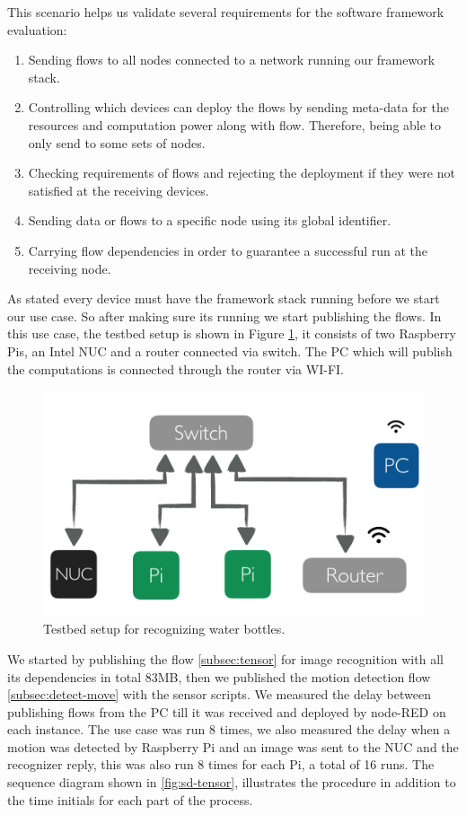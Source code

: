 This scenario helps us validate several requirements for the software framework evaluation: 
\begin{enumerate}
	\item Sending flows to all nodes connected to a network  running our framework stack.
	\item Controlling which devices can deploy the flows by sending meta-data for the resources and computation power along with flow. Therefore, being able to only send to some sets of nodes.
	\item Checking requirements of flows and rejecting the deployment if they were not satisfied at the receiving devices.
	\item Sending data or flows to a  specific node using its global identifier.
	\item Carrying flow dependencies in order to guarantee a successful run at the receiving node.
\end{enumerate}

\noindent As stated every device must have the framework stack running before we start our use case. So after making sure its running we start publishing the flows. In this use case, the testbed setup is shown in Figure \ref{fig:tb-tensor}, it consists of two Raspberry Pis, an Intel NUC and a router connected via switch. The PC which will publish the computations is connected through the router via WI-FI. 
 \begin{figure}[H]
	\centering
	\includegraphics[scale=0.6]{images/tb-tensor.png}
	\caption{Testbed setup for recognizing water bottles.}
	\label{fig:tb-tensor}
\end{figure} 



\noindent We started by publishing the flow \ref{subsec:tensor} for  image recognition with all its dependencies in total 83MB, then we published the motion detection flow \ref{subsec:detect-move} with the sensor scripts. We measured the delay between publishing flows from the PC till it was received and deployed by node-RED on each instance. The use case was run 8 times, we also measured the delay when a motion was detected by Raspberry Pi and an image was sent to the NUC and the recognizer reply, this was also run 8 times for each Pi, a total of 16 runs. The sequence diagram shown in \ref{fig:sd-tensor},  illustrates the procedure in addition to the time initials for each part of the process.  \\



